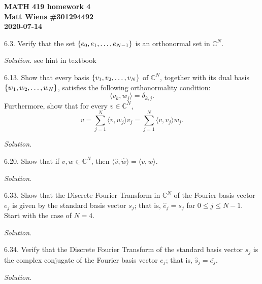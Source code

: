 \documentclass{article}
\newcommand{\C}{\mathbb{C}}
\begin{document}
\textbf{MATH 419 homework 4} \\
\textbf{Matt Wiens \#301294492} \\
\textbf{2020-07-14}

6.3. Verify that the set $\cbr{e_0, e_1, \ldots, e_{N - 1}}$
is an orthonormal set in $\C^N$.

\textit{Solution.}
see hint in textbook

\newpage

6.13. Show that every basis $\cbr{v_1, v_2, \ldots, v_N}$ of
$\C^N$, together with its dual basis $\cbr{w_1, w_2, \ldots, w_N}$,
satisfies the following orthonormality condition:
%
\begin{equation*}
    \langle v_k, w_j \rangle = \delta_{k, j}
    .
\end{equation*}
%
Furthermore, show that for every $v \in \C^N$,
%
\begin{equation*}
    v
    = \sum_{j = 1}^N \langle v, w_j \rangle v_j
    = \sum_{j = 1}^N \langle v, v_j \rangle w_j
    .
\end{equation*}

\textit{Solution.}

\newpage

6.20. Show that if $v, w \in \C^N$, then
$\langle \widehat{v}, \widehat{w} \rangle = \langle v, w \rangle$.

\textit{Solution.}

\newpage

6.33. Show that the Discrete Fourier Transform in $\C^N$ of
the Fourier basis vector $e_j$ is given by the standard basis
vector $s_j$; that is, $\widehat{e}_j = s_j$ for $0 \leq j \leq N - 1$.
Start with the case of $N = 4$.

\textit{Solution.}

\newpage

6.34. Verify that the Discrete Fourier Transform of the
standard basis vector $s_j$ is the complex conjugate of the
Fourier basis vector $e_j$; that is,
$\widehat{s}_j = \overline{e_j}$.

\textit{Solution.}
\end{document}

